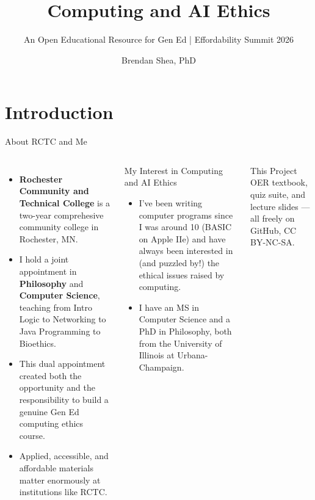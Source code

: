 \documentclass[aspectratio=169,10pt]{beamer}
\title{Computing and AI Ethics}
\subtitle{An Open Educational Resource for Gen Ed | Effordability Summit 2026}
\author{Brendan Shea, PhD}
\institute{Rochester Community and Technical College --- Philosophy \& Computer Science}
\date{}
\begin{document}
{%
%
\begin{frame}
\titlepage
\end{frame}%
}

\section{Introduction}

\begin{frame}{About RCTC and Me}
\begin{columns}[c]
\begin{itemize}
  \item \textbf{Rochester Community and Technical College} is a two-year comprehesive community college in Rochester, MN. 
  \item I hold a joint appointment in \textbf{Philosophy} and \textbf{Computer Science}, teaching from Intro Logic to Networking to Java Programming to Bioethics.
  \item This dual appointment created both the opportunity and the responsibility to build a genuine Gen Ed computing ethics course.
  \item Applied, accessible, and affordable materials matter enormously at institutions like RCTC.
\end{itemize}
\begin{block}{My Interest in Computing and AI Ethics}
\footnotesize
\begin{itemize}
  \item I've been writing computer programs since I was around 10 (BASIC on Apple IIe) and have always been interested in (and puzzled by!) the ethical issues raised by computing.
  \item I have an MS in Computer Science and a PhD in Philosophy, both from the University of Illinois at Urbana-Champaign.
\end{itemize}
\end{block}
\vspace{0.3em}
\begin{block}{This Project}
\footnotesize OER textbook, quiz suite, and lecture slides --- all freely on GitHub, CC BY-NC-SA.
\end{block}
\end{columns}
\end{frame}
\end{document}
